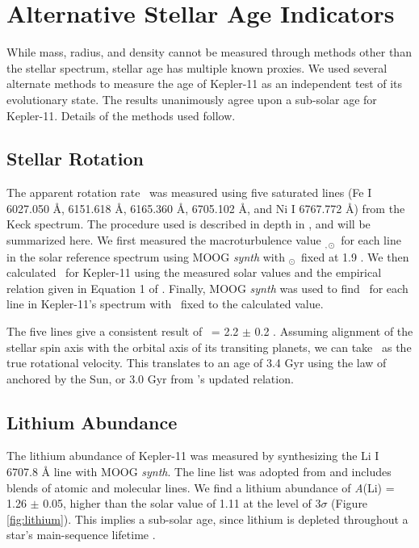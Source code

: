 \documentclass[oneside]{emulateapj}
\begin{document}
\section{Alternative Stellar Age Indicators}
\label{s:ages}

While mass, radius, and density cannot be measured through methods other than the stellar spectrum, stellar age has multiple known proxies. We used several alternate methods to measure the age of Kepler-11 as an independent test of its evolutionary state. The results unanimously agree upon a sub-solar age for Kepler-11. Details of the methods used follow.

\subsection{Stellar Rotation}

The apparent rotation rate \vsini\ was measured using five saturated lines (Fe I 6027.050 \r{A}, 6151.618 \r{A}, 6165.360 \r{A}, 6705.102 \r{A}, and Ni I 6767.772 \r{A}) from the Keck spectrum. The procedure used is described in depth in \citet{dosSantos2016}, and will be summarized here. We first measured the macroturbulence value \vmacro$_{,\odot}$\ for each line in the solar reference spectrum using MOOG \textit{synth} with \vsini$_{\odot}$\ fixed at 1.9 \kms. We then calculated \vmacro\ for Kepler-11 using the measured solar values and the empirical relation given in Equation 1 of \citet{dosSantos2016}. Finally, MOOG \textit{synth} was used to find \vsini\ for each line in Kepler-11's spectrum with \vmacro\ fixed to the calculated value.

The five lines give a consistent result of \vsini\ = 2.2 $\pm$ 0.2 \kms. Assuming alignment of the stellar spin axis with the orbital axis of its transiting planets, we can take \vsini\ as the true rotational velocity. This translates to an age of 3.4 Gyr using the law of \citet{Skumanich1972} anchored by the Sun, or 3.0 Gyr from \citet{dosSantos2016}'s updated relation.

\subsection{Lithium Abundance}
\label{s:lithium}

The lithium abundance of Kepler-11 was measured by synthesizing the Li I 6707.8 \r{A} line with MOOG \textit{synth}. The line list was adopted from \citet{Melendez2012} and includes blends of atomic and molecular lines. We find a lithium abundance of \textit{A}(Li) = 1.26 $\pm$ 0.05, higher than the solar value of 1.11 at the level of 3$\sigma$ (Figure \ref{fig:lithium}). This implies a sub-solar age, since lithium is depleted throughout a star's main-sequence lifetime \citep{Duncan1981}.
\end{document}
